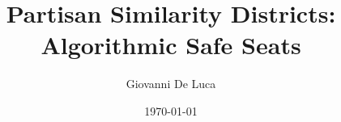 \documentclass[12pt]{article}
\title{Partisan Similarity Districts: Algorithmic Safe Seats}
\author{Giovanni De Luca}
\date{\today}
\begin{document}
\maketitle

\begin{abstract}

\end{abstract}










\end{document}
